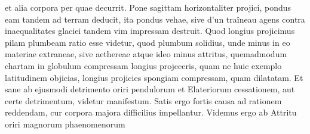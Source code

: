  et alia corpora per quae decurrit. Pone sagittam\protect{} horizontaliter projici, pondus\protect{} eam tandem ad terram deducit, ita pondus\protect{} vehae, sive d'un traîneau agens contra inaequalitates glaciei tandem vim\protect{} impressam destruit. Quod longius projicimus pilam\protect{} plumbeam  ratio esse videtur, quod plumbum\protect{} solidius, unde minus in eo materiae extraneae, sive aethereae atque ideo minus attritus\protect{}, quemadmodum chartam in globulum\protect{} compressam longius projeceris, quam  
\count{}
ne huic exemplo  latitudinem objicias, longius projicies spongiam compressam, quam dilatatam. Et sane ab ejusmodi detrimento\protect{} oriri pendulorum\protect{} et Elateriorum cessationem, aut certe detrimentum\protect{}, videtur manifestum. Satis ergo fortis causa ad rationem reddendam, cur corpora majora difficilius impellantur. Videmus ergo ab Attritu\protect{} oriri magnorum phaenomenorum%